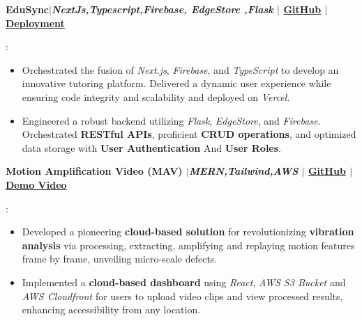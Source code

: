\documentclass[a4paper,11pt]{article}
\newcommand{\resumeItem}[2]{
  \item\small{
    \textbf{#1}{: #2 \vspace{-2pt}}
  }
}
\newcommand{\resumeSubItem}[2]{\resumeItem{#1}{#2}\vspace{-3pt}}
\begin{document}
\resumeSubItem{\textbf{EduSync}$|$\emph{NextJs,Typescript,Firebase, EdgeStore ,Flask} 
$|$
\textmd{\href{https://github.com/Akash-Singh04/EduSync}{GitHub}}
$|$
\textmd{\href{https://edu-sync-phi.vercel.app/}{Deployment}}
}{
\vspace{-5pt}
\begin{itemize}
\item Orchestrated the fusion of \textit{Next.js}, \textit{Firebase}, and \textit{TypeScript} to develop an innovative tutoring platform. Delivered a dynamic user experience while ensuring code integrity and scalability and deployed on \textit{Vercel}.
\item Engineered a robust backend utilizing \textit{Flask}, \textit{EdgeStore}, and \textit{Firebase}. Orchestrated \textbf{RESTful APIs}, proficient \textbf{CRUD operations}, and optimized data storage with \textbf{User Authentication} And \textbf{User Roles}.
\end{itemize}
}
\vspace{-5pt}

\resumeSubItem{\textbf{Motion Amplification Video (MAV)} $|$\emph{MERN,Tailwind,AWS}
$|$
\textmd{\href{https://github.com/Akash-Singh04/Motion-Amplification-Video}{GitHub}}
$|$
\textmd{\href{https://youtu.be/ygeVFEa4_oo}{Demo Video}
}
}{
\vspace{-5pt}
\begin{itemize}
\item Developed a pioneering \textbf{cloud-based solution} for revolutionizing \textbf{vibration analysis} via processing, extracting, amplifying and replaying motion features frame by frame, unveiling micro-scale defects.
\item Implemented a \textbf{cloud-based dashboard} using \textit{React}, \textit{AWS S3 Bucket} and \textit{AWS Cloudfront} for users to upload video clips and view processed results, enhancing accessibility from any location.
\end{itemize}
\vspace{-5pt}
}
\end{document}
